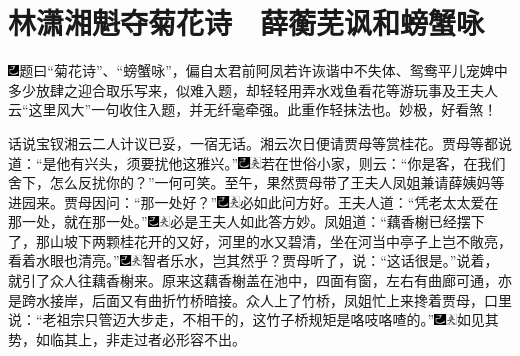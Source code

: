 

\chapter{林潇湘魁夺菊花诗　薛蘅芜讽和螃蟹咏}

{\includegraphics[width=3mm]{../Images/00003}题曰``菊花诗''、``螃蟹咏''，偏自太君前阿凤若许诙谐中不失体、鸳鸯平儿宠婢中多少放肆之迎合取乐写来，似难入题，却轻轻用弄水戏鱼看花等游玩事及王夫人云``这里风大''一句收住入题，并无纤毫牵强。此重作轻抹法也。妙极，好看煞！}

话说宝钗湘云二人计议已妥，一宿无话。湘云次日便请贾母等赏桂花。贾母等都说道：``是他有兴头，须要扰他这雅兴。''{\includegraphics[width=3mm]{../Images/00003}\includegraphics[width=3mm]{../Images/00012}\footnotesize \kaishu 若在世俗小家，则云：``你是客，在我们舍下，怎么反扰你的？''一何可笑。}至午，果然贾母带了王夫人凤姐兼请薛姨妈等进园来。贾母因问：``那一处好？''{\includegraphics[width=3mm]{../Images/00003}\includegraphics[width=3mm]{../Images/00012}\footnotesize \kaishu 必如此问方好。}王夫人道：``凭老太太爱在那一处，就在那一处。''{\includegraphics[width=3mm]{../Images/00003}\includegraphics[width=3mm]{../Images/00012}\footnotesize \kaishu 必是王夫人如此答方妙。}凤姐道：``藕香榭已经摆下了，那山坡下两颗桂花开的又好，河里的水又碧清，坐在河当中亭子上岂不敞亮，看着水眼也清亮。''{\includegraphics[width=3mm]{../Images/00003}\includegraphics[width=3mm]{../Images/00012}\footnotesize \kaishu 智者乐水，岂其然乎？}贾母听了，说：``这话很是。''说着，就引了众人往藕香榭来。原来这藕香榭盖在池中，四面有窗，左右有曲廊可通，亦是跨水接岸，后面又有曲折竹桥暗接。众人上了竹桥，凤姐忙上来搀着贾母，口里说：``老祖宗只管迈大步走，不相干的，这竹子桥规矩是咯吱咯喳的。''{\includegraphics[width=3mm]{../Images/00003}\includegraphics[width=3mm]{../Images/00012}\footnotesize \kaishu 如见其势，如临其上，非走过者必形容不出。}

